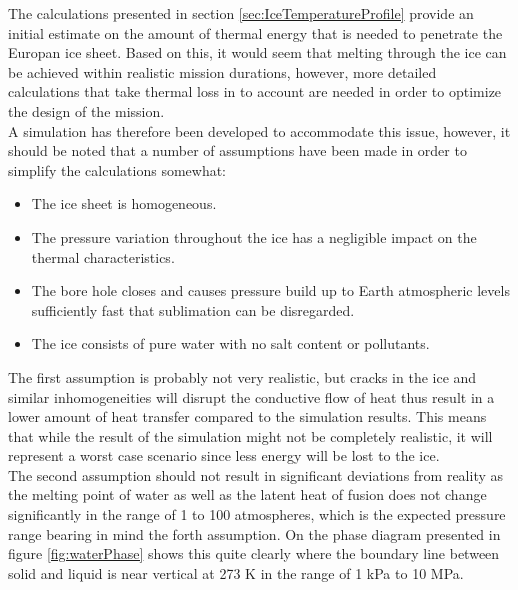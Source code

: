 \label{sec:temp_simulation}

The calculations presented in section \ref{sec:IceTemperatureProfile} provide an initial estimate on the amount of thermal energy that is needed to penetrate the Europan ice sheet. Based on this, it would seem that melting through the ice can be achieved within realistic mission durations, however, more detailed calculations that take thermal loss in to account are needed in order to optimize the design of the mission. \\

\noindent
A simulation has therefore been developed to accommodate this issue, however, it should be noted that a number of assumptions have been made in order to simplify the calculations somewhat:
\begin{itemize}
	\item The ice sheet is homogeneous.
	\item The pressure variation throughout the ice has a negligible impact on the thermal characteristics.
	\item The bore hole closes and causes pressure build up to Earth atmospheric levels sufficiently fast that sublimation can be disregarded.
	\item The ice consists of pure water with no salt content or pollutants.
\end{itemize}
The first assumption is probably not very realistic, but cracks in the ice and similar inhomogeneities will disrupt the conductive flow of heat thus result in a lower amount of heat transfer compared to the simulation results. This means that while the result of the simulation might not be completely realistic, it will represent a worst case scenario since less energy will be lost to the ice. \\

\noindent
The second assumption should not result in significant deviations from reality as the melting point of water as well as the latent heat of fusion does not change significantly in the range of 1 to 100 atmospheres, which is the expected pressure range bearing in mind the forth assumption. On the phase diagram presented in figure \ref{fig:waterPhase} shows this quite clearly where the boundary line between solid and liquid is near vertical at 273 K in the range of 1 kPa to 10 MPa.\\

